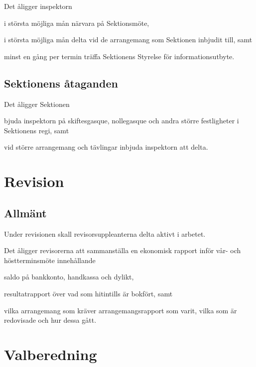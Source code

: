 \documentclass[10pt]{article}
\begin{document}
Det åligger inspektorn

\begin{attlist}
    \item i största möjliga mån närvara på Sektionsmöte,
    \item i största möjliga mån delta vid de arrangemang som Sektionen
        inbjudit till, samt
    \item minst en gång per termin träffa Sektionens Styrelse för
        informationsutbyte.
\end{attlist}

\subsection{Sektionens åtaganden}

Det åligger Sektionen
\begin{attlist}
    \item bjuda inspektorn på skiftesgasque, nollegasque och andra större
        festligheter i Sektionens regi, samt
    \item vid större arrangemang och tävlingar inbjuda inspektorn att delta.
\end{attlist}

\section{Revision}

\subsection{Allmänt}

Under revisionen skall revisorsuppleanterna delta aktivt i arbetet.

Det åligger revisorerna att sammanställa en ekonomisk rapport inför vår-
och höstterminsmöte innehållande
\begin{alphlist}
    \item saldo på bankkonto, handkassa och dylikt,
    \item resultatrapport över vad som hitintills är bokfört, samt
    \item vilka arrangemang som kräver arrangemangsrapport som varit,
        vilka som är redovisade och hur dessa gått.
\end{alphlist}

\section{Valberedning}
\end{document}
